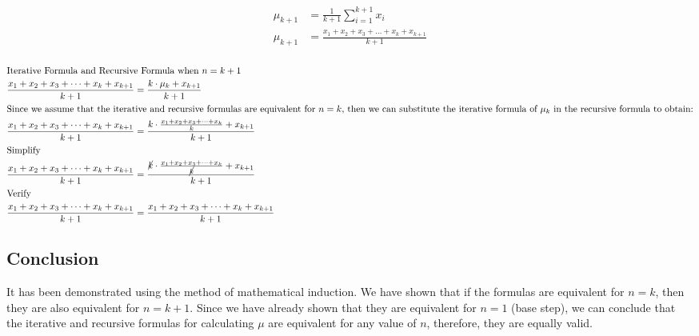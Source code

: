 \documentclass[24pt]{article}
\begin{document}
    \begin{align}
        \mu_{k+1} &= \frac{1}{k+1} \sum_{i=1}^{k+1} x_i \\
        \mu_{k+1} &= \frac{x_1 + x_2 + x_3 + \dots + x_k + x_{k+1}}{k+1} \\
    \end{align}

    \begin{align}
        \intertext{Iterative Formula and Recursive Formula when $n = k + 1$}
        \frac{x_1 + x_2 + x_3 + \dots + x_k + x_{k+1}}{k+1} &= \frac{k \cdot \mu_{k} + x_{k+1}}{k+1} \\
        \intertext{Since we assume that the iterative and recursive formulas are equivalent for $n = k$, then we can substitute the iterative formula of $\mu_{k}$ in the recursive formula to obtain:}
        \frac{x_1 + x_2 + x_3 + \dots + x_k + x_{k+1}}{k+1} &= \frac{k \cdot \frac{x_1 + x_2 + x_3 + \dots + x_k}{k} + x_{k+1}}{k+1} \\
        \intertext{Simplify}
        \frac{x_1 + x_2 + x_3 + \dots + x_k + x_{k+1}}{k+1} &= \frac{\cancel{k} \cdot \frac{x_1 + x_2 + x_3 + \dots + x_k}{\cancel{k}} + x_{k+1}}{k+1} \\
        \intertext{Verify}
        \frac{x_1 + x_2 + x_3 + \dots + x_k + x_{k+1}}{k+1} &= \frac{x_1 + x_2 + x_3 + \dots + x_k + x_{k+1}}{k+1}
    \end{align}

    \subsection{Conclusion}\label{subsec:conclusion}
    It has been demonstrated using the method of mathematical induction.
    We have shown that if the formulas are equivalent for $n = k$, then they are also equivalent for $n = k + 1$.
    Since we have already shown that they are equivalent for $n = 1$ (base step),
    we can conclude that the iterative and recursive formulas for calculating $\mu$ are equivalent for any value of $n$,
    therefore, they are equally valid.
\end{document}
